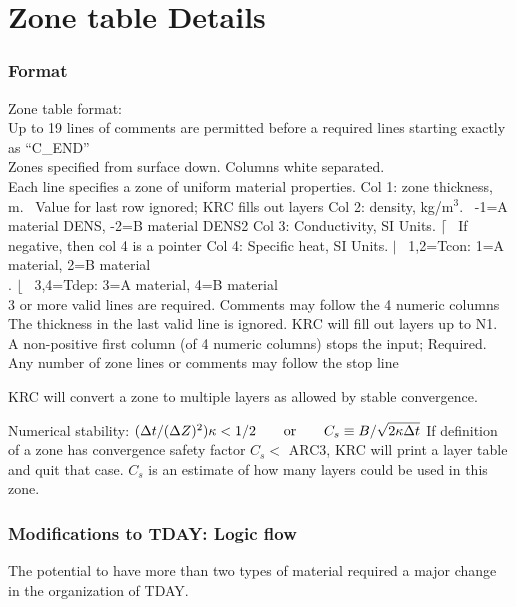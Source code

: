 \documentclass{article}
\begin{document}
\section{Zone table Details \label{devd}} %
\subsubsection{Format \label{zform}}
Zone table format: 
\\ Up to 19 lines of comments are permitted before a required lines starting exactly as ``C_END''
\\ Zones specified from surface down. Columns white separated.
\\ Each line specifies a zone of uniform material properties.
\qi Col 1: zone thickness, m. \  Value for last row ignored; KRC fills out layers
\qi Col 2: density, kg/m$^3$.   \  -1=A material DENS,   -2=B material DENS2
\qi Col 3: Conductivity, SI Units. $\lceil$ \ If negative, then col 4 is a pointer
\qi Col 4: Specific heat, SI Units. $|$ \ 1,2=Tcon: 1=A material, 2=B material
 \\. \hspace{4.cm} $\lfloor$ \ 3,4=Tdep: 3=A material, 4=B material
\\ 3 or more valid lines are required. Comments may follow the 4 numeric columns
\\ The thickness in the last valid line is ignored. KRC will fill out layers up to N1. 
\\ A non-positive first column (of 4 numeric columns) stops the input; Required.
\qi Any number of zone lines or comments may follow the stop line

KRC will convert a zone to multiple layers as allowed by stable convergence.

Numerical stability: $ (\Delta t / (\Delta Z)^2) \kappa < 1/2  \hspace{7mm} \mathrm{or} \hspace{7mm} C_s \equiv B / \sqrt{2  \kappa \Delta t}$
\qii If definition of a zone has convergence safety factor $C_s <$ ARC3, KRC will print a layer table and quit that case.
\qii $C_s$ is an estimate of how many layers could be used in this zone.

\subsubsection{Modifications to TDAY: Logic flow }
The potential to have more than two types of material required a major change in the organization of TDAY. 
\end{document}
